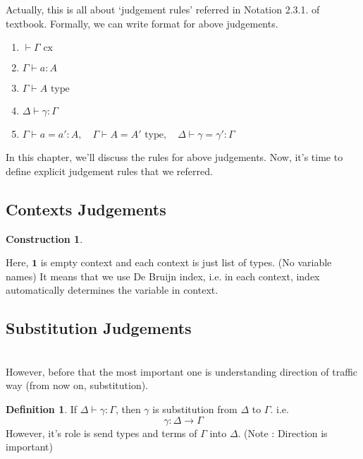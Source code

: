 \documentclass[12pt, letterpaper]{amsart}
\theoremstyle{definition}
\newtheorem{defn}[thm]{Definition}
\newtheorem{con}[thm]{Construction}
\theoremstyle{remark}
\theoremstyle{plain}
\numberwithin{equation}{section}
\begin{document}
Actually, this is all about \lq judgement rules' referred in Notation 2.3.1. of textbook. 
Formally, we can write format for above judgements. 

\begin{tcolorbox}[colback=yellow!10!white,colframe=red!75!black,title=Formal Representations for Judgements]
    \begin{enumerate}
        \item $\vdash \Gamma \text{ cx}$
        \item $\Gamma \vdash a : A$
        \item $\Gamma \vdash A \text{ type}$
        \item $\Delta \vdash \gamma : \Gamma$
        \item $\Gamma \vdash a = a' : A, \quad \Gamma \vdash A = A' \text{ type}, \quad \Delta \vdash \gamma = \gamma' : \Gamma$ 
    \end{enumerate}
\end{tcolorbox}

In this chapter, we'll discuss the rules for above judgements. 
Now, it's time to define explicit judgement rules that we referred. 
\newpage
\subsection{Contexts Judgements}
\begin{con}\label{cx judgement}
\end{con}
Here, $\mathbf{1}$ is empty context and each context is just list of types. (No variable names) It means that 
we use De Bruijn index, i.e. in each context, index automatically determines the variable in context. 

\subsection{Substitution Judgements}\label{subst judgement} \quad \\

However, before that the most 
important one is understanding direction of traffic way (from now on, substitution). 

\begin{defn}
    If $\Delta \vdash \gamma : \Gamma$, then $\gamma$ is substitution from $\Delta$ to $\Gamma$. i.e. 
    \[\gamma : \Delta \rightarrow \Gamma\]
    However, it's role is send types and terms of $\Gamma$ into $\Delta$. (Note : Direction is important)
\end{defn} 
\end{document}
